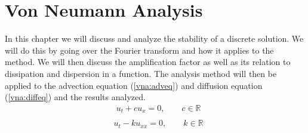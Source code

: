 \chapter{Von Neumann Analysis}
In this chapter we will discuss and analyze the stability of a discrete solution. We will do this by going over the Fourier transform and how it applies to the method. We will then discuss the amplification factor as well as its relation to dissipation and dispersion in a function. The analysis method will then be applied to the advection equation (\ref{vna:adveq}) and diffusion equation (\ref{vna:diffeq}) and the results analyzed.
\begin{equation} \label{vna:adveq}
\begin{align}
  &u_t + cu_x = 0, \qquad c \in \mathbb{R} \\ 
\end{align}
\end{equation}
\begin{equation} \label{vna:diffeq}
\begin{align}
  &u_{t} - ku_{xx} = 0, \qquad k \in \mathbb{R} \\ 
\end{align}
\end{equation}
